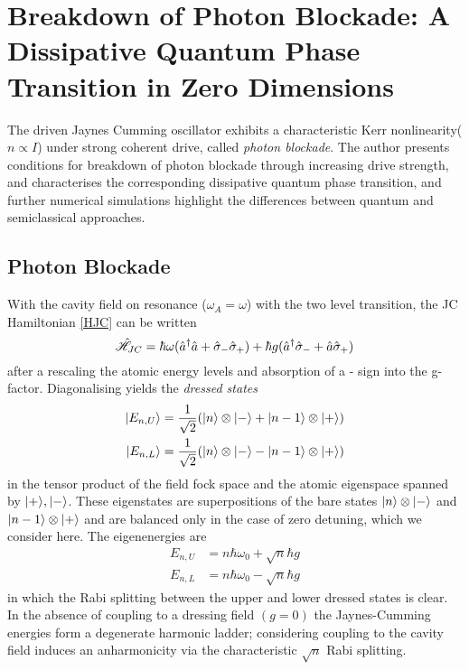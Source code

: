 
\section{Breakdown of Photon Blockade: A Dissipative Quantum Phase Transition in Zero Dimensions}

The driven Jaynes Cumming oscillator exhibits a characteristic Kerr nonlinearity($n \propto I$) under strong coherent drive, called \emph{photon blockade}\autocite{Carmichael2015}. The author presents conditions for breakdown of photon blockade through increasing drive strength, and characterises the corresponding dissipative quantum phase transition, and further numerical simulations highlight the differences between quantum and semiclassical approaches. 
\subsection{Photon Blockade}
With the cavity field on resonance ($\omega_A = \omega$) with the two level transition, the JC Hamiltonian \ref{HJC} can be written\autocite[3]{Carmichael2015}
\begin{equation}
	\hat{\mathscr{H}}_{JC} = \hbar \omega (\hat{a}^\dagger \hat{a} + \hat{\sigma}_- \hat{\sigma}_+) +\hbar g (\hat{a}^\dagger \hat{\sigma}_- + \hat{a} \hat{\sigma}_+)
\end{equation}
after a rescaling the atomic energy levels and absorption of a - sign into the g-factor. Diagonalising yields the \emph{dressed states}
\begin{align}
	| E_{n, U} \rangle & = \frac{1}{\sqrt{2}} (| n \rangle \otimes | - \rangle+| n-1 \rangle \otimes | + \rangle) \\
	| E_{n, L} \rangle & = \frac{1}{\sqrt{2}} (| n \rangle \otimes | - \rangle-| n-1 \rangle \otimes | + \rangle)
\end{align} 
in the tensor product of the field fock space and the atomic eigenspace spanned by $| + \rangle, | - \rangle$. These eigenstates are superpositions of the bare states $| n \rangle \otimes | - \rangle$ and $| n-1 \rangle \otimes | + \rangle$ and are balanced only in the case of zero detuning, which we consider here. The eigenenergies are 
\begin{align}
	E_{n, U} &= n \hbar \omega_0 + \sqrt{n} \hbar g \\
	E_{n, L} &= n \hbar \omega_0 - \sqrt{n} \hbar g
\end{align}
in which the Rabi splitting between the upper and lower dressed states is clear. In the absence of coupling to a dressing field $(g=0)$ the Jaynes-Cumming energies form a degenerate harmonic ladder; considering coupling to the cavity field induces an anharmonicity via the characteristic $\sqrt{n}$ Rabi splitting.

